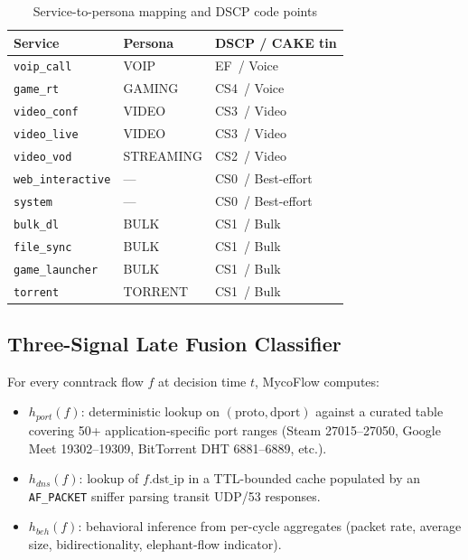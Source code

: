 \documentclass[journal,onecolumn]{IEEEtran}
\begin{document}
\begin{table}[t]
\centering
\caption{Service-to-persona mapping and DSCP code points}
\label{tab:taxonomy}
\begin{tabular}{lll}
\toprule
\textbf{Service} & \textbf{Persona} & \textbf{DSCP / CAKE tin} \\
\midrule
\texttt{voip\_call}        & VOIP       & EF~/ Voice \\
\texttt{game\_rt}          & GAMING     & CS4~/ Voice \\
\texttt{video\_conf}       & VIDEO      & CS3~/ Video \\
\texttt{video\_live}       & VIDEO      & CS3~/ Video \\
\texttt{video\_vod}        & STREAMING  & CS2~/ Video \\
\texttt{web\_interactive}  & ---        & CS0~/ Best-effort \\
\texttt{system}            & ---        & CS0~/ Best-effort \\
\texttt{bulk\_dl}          & BULK       & CS1~/ Bulk \\
\texttt{file\_sync}        & BULK       & CS1~/ Bulk \\
\texttt{game\_launcher}    & BULK       & CS1~/ Bulk \\
\texttt{torrent}           & TORRENT    & CS1~/ Bulk \\
\bottomrule
\end{tabular}
\end{table}

\subsection{Three-Signal Late Fusion Classifier}

For every conntrack flow $f$ at decision time $t$, MycoFlow computes:
\begin{itemize}
\item $h_{port}(f)$: deterministic lookup on $(\text{proto}, \text{dport})$
  against a curated table covering 50+ application-specific port ranges
  (Steam 27015--27050, Google Meet 19302--19309, BitTorrent DHT 6881--6889,
  etc.).
\item $h_{dns}(f)$: lookup of $f.\text{dst\_ip}$ in a TTL-bounded cache
  populated by an \texttt{AF\_PACKET} sniffer parsing transit UDP/53
  responses.
\item $h_{beh}(f)$: behavioral inference from per-cycle aggregates
  (packet rate, average size, bidirectionality, elephant-flow indicator).
\end{itemize}
\end{document}
